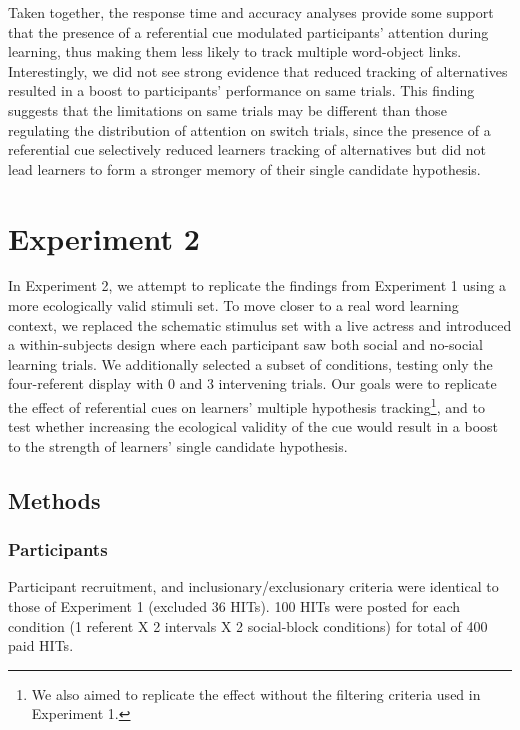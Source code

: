 \documentclass[10pt,letterpaper]{article}
\begin{document}
Taken together, the response time and accuracy analyses provide some support that the presence of a referential cue modulated participants' attention during learning, thus making them less likely to track multiple word-object links. Interestingly, we did not see strong evidence that reduced tracking of alternatives resulted in a boost to participants' performance on same trials. This finding suggests that the limitations on same trials may be different than those regulating the distribution of attention on switch trials, since the presence of a referential cue selectively reduced learners tracking of alternatives but did not lead learners to form a stronger memory of their single candidate hypothesis. 


\section{Experiment 2}

In Experiment 2, we attempt to replicate the findings from Experiment 1 using a more ecologically valid stimuli set. To move closer to a real word learning context, we replaced the schematic stimulus set with a live actress and introduced a within-subjects design where each participant saw both social and no-social learning trials. We additionally selected a subset of conditions, testing only the four-referent display with 0 and 3 intervening trials. Our goals were to replicate the effect of referential cues on learners' multiple hypothesis tracking\footnote{We also aimed to replicate the effect without the filtering criteria used in Experiment 1.}, and to test whether increasing the ecological validity of the cue would result in a boost to the strength of learners' single candidate hypothesis.  

\subsection{Methods}

\subsubsection{Participants}

Participant recruitment, and inclusionary/exclusionary criteria were identical to those of Experiment 1 (excluded 36 HITs). 100 HITs were posted for each condition (1 referent X 2 intervals X 2 social-block conditions) for total of 400 paid HITs.  
\end{document}
